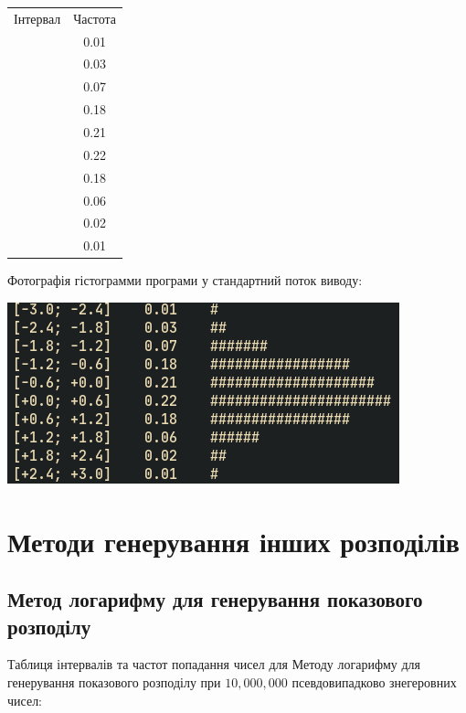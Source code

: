 \documentclass[a4paper,12pt]{report}
\begin{document}
\begin{table}[ht]
\centering %
\begin{tabular}{c c} %
  Інтервал & Частота \\\relax
[-3.0; -2.4] & 0.01 \\\relax
[-2.4; -1.8] & 0.03  \\\relax
[-1.8; -1.2] & 0.07 \\\relax
[-1.2; -0.6] & 0.18 \\\relax
[-0.6; +0.0] & 0.21 \\\relax
[+0.0; +0.6] & 0.22 \\\relax
[+0.6; +1.2] & 0.18 \\\relax
[+1.2; +1.8] & 0.06 \\\relax
[+1.8; +2.4] & 0.02 \\\relax
[+2.4; +3.0] & 0.01
\end{tabular}
\end{table}
Фотографія гістограмми програми у стандартний поток виводу:
\begin{center}\includegraphics[scale=0.5]{correl}\end{center}

\section{Методи генерування інших розподілів}

\subsection{Метод логарифму для генерування показового розподілу}
Таблиця інтервалів та частот попадання чисел для Методу логарифму для генерування показового розподілу при $10,000,000$ псевдовипадково знегеровних чисел:
\end{document}
